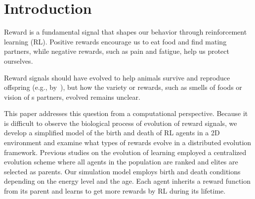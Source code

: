 \section{Introduction}\label{sec:intro}
Reward is a fundamental signal that shapes our behavior through reinforcement learning (RL). 
Positive rewards encourage us to eat food and find mating partners, while negative rewards, such as pain and fatigue, help us protect ourselves. 

Reward signals should have evolved to help animals survive and reproduce offspring (e.g., by~\cite{schultzNeuronalRewardDecision2015}), but how the variety or rewards, such as smells of foods or vision of s partners, evolved remains unclear.

This paper addresses this question from a computational perspective. 
Because it is difficult to observe the biological process of evolution of reward signals, we develop a simplified model of the birth and death of RL agents in a 2D environment and examine what types of rewards evolve in a
distributed evolution framework.
Previous studies on the evolution of learning \citep{hintonHowLearningCan1987,singhWhereRewardsCome2009} employed a centralized evolution scheme where all agents in the population are ranked and elites are selected as parents.
Our simulation model employs birth and death conditions depending on the energy level and the age. Each agent inherits a reward function from its parent and learns to get more rewards by RL during its lifetime. %

